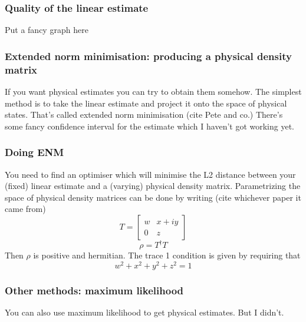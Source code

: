 \documentclass{beamer}
\begin{document}
\begin{frame}
  \frametitle{Quality of the linear estimate}
  Put a fancy graph here
\end{frame}

\begin{frame}
  \frametitle{Extended norm minimisation: producing a physical density matrix}
  If you want physical estimates you can try to obtain them somehow. The simplest method is to take the linear estimate and project it onto the space of physical states. That's called extended norm minimisation (cite Pete and co.) There's some fancy confidence interval for the estimate which I haven't got working yet.
\end{frame}

\begin{frame}
  \frametitle{Doing ENM}
  You need to find an optimiser which will minimise the L2 distance between your (fixed) linear estimate and a (varying) physical density matrix. Parametrizing the space of physical density matrices can be done by writing (cite whichever paper it came from)
  \begin{equation}
    T = \begin{bmatrix}w&x+iy\\0&z\end{bmatrix}
  \end{equation}
  \begin{equation}
    \rho = T^\dagger T
  \end{equation}
  Then $\rho$ is positive and hermitian. The trace 1 condition is given by requiring that
  \begin{equation}
    w^2+x^2+y^2+z^2=1
  \end{equation}
\end{frame}

\begin{frame}
  \frametitle{Other methods: maximum likelihood}
  You can also use maximum likelihood to get physical estimates. But I didn't.
\end{frame}
\end{document}
